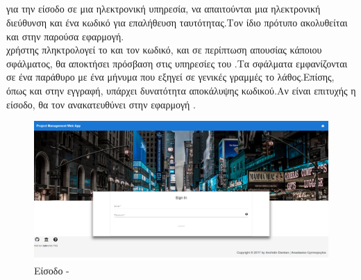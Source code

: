 \subsection*{}
 για την είσοδο σε μια ηλεκτρονική υπηρεσία, να απαιτούνται μια ηλεκτρονική διεύθυνση και ένα κωδικό για επαλήθευση ταυτότητας.Τον ίδιο πρότυπο ακολυθείται και στην παρούσα εφαρμογή.\\
 χρήστης πληκτρολογεί το  και τον κωδικό, και σε περίπτωση απουσίας κάποιου σφάλματος, θα αποκτήσει πρόσβαση στις υπηρεσίες του .Τα σφάλματα εμφανίζονται σε ένα  παράθυρο με ένα μήνυμα που εξηγεί σε γενικές γραμμές το λάθος.Επίσης, όπως και στην εγγραφή, υπάρχει δυνατότητα αποκάλυψης κωδικού.Αν είναι επιτυχής η είσοδο, θα τον ανακατευθύνει στην εφαρμογή .

\begin{figure}[!htb]
\centering
\includegraphics[scale=0.2]{images/login.png}
\caption{Είσοδο - }
\label{fig:login}
\end{figure}

